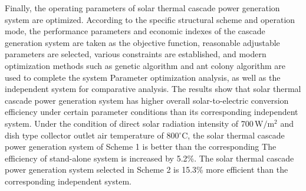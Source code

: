Finally, the operating parameters of solar thermal cascade power generation system are optimized. According to the specific structural scheme and operation mode, the performance parameters and economic indexes of the cascade generation system are taken as the objective function, reasonable adjustable parameters are selected, various constraints are established, and modern optimization methods such as genetic algorithm and ant colony algorithm are used to complete the system Parameter optimization analysis, as well as the independent system for comparative analysis. The results show that solar thermal cascade power generation system has higher overall solar-to-electric conversion efficiency under certain parameter conditions than its corresponding independent system. Under the condition of direct solar radiation intensity of 700\,$\mathrm{W/m^2}$ and dish type collector outlet air temperature of 800$\mathrm{^\circ C}$, the solar thermal cascade power generation system of Scheme 1 is better than the corresponding The efficiency of stand-alone system is increased by 5.2\%. The solar thermal cascade power generation system selected in Scheme 2 is 15.3\% more efficient than the corresponding independent system.
